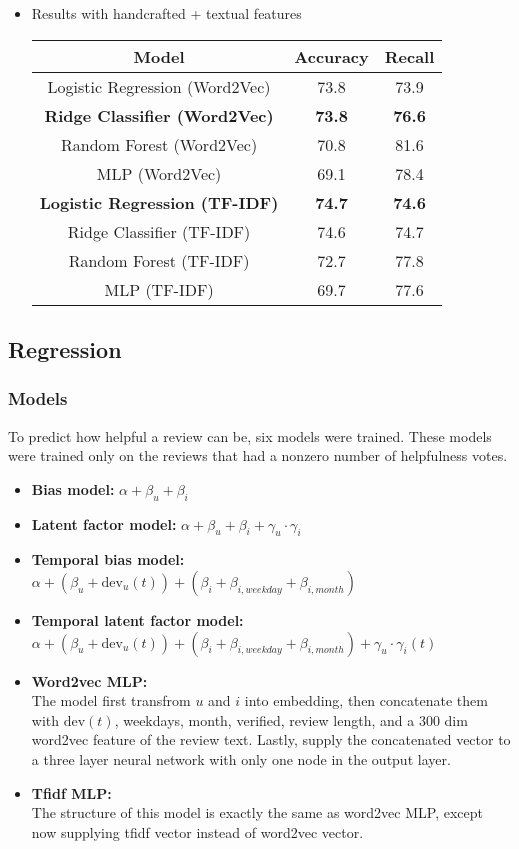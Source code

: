 \documentclass[final]{cvpr}
\begin{document}
\begin{itemize}
\item Results with handcrafted + textual features
\begin{center}
\begin{tabular}{ c c c } 
\hline
Model & Accuracy & Recall\\ 
\hline
Logistic Regression (Word2Vec) & 73.8 & 73.9 \\ 
\textbf{Ridge Classifier (Word2Vec)} & \textbf{73.8} & \textbf{76.6} \\
Random Forest (Word2Vec) & 70.8 & 81.6 \\
MLP (Word2Vec) & 69.1 & 78.4 \\
\textbf{Logistic Regression (TF-IDF)} & \textbf{74.7} & \textbf{74.6} \\ 
Ridge Classifier (TF-IDF) & 74.6 & 74.7 \\
Random Forest (TF-IDF) & 72.7 & 77.8 \\
MLP (TF-IDF) & 69.7 & 77.6 \\
\hline
\end{tabular}
\end{center}
\end{itemize}

\subsection{Regression}

\subsubsection{Models}
To predict how helpful a review can be, six models were trained. These models were trained only on the reviews that had a nonzero number of helpfulness votes.
\begin{itemize}
\item \textbf{Bias model:} $\alpha + \beta_u + \beta_i$
\item \textbf{Latent factor model:} $\alpha + \beta_u + \beta_i + \gamma_u \cdot \gamma_i$
\item \textbf{Temporal bias model:} \\
$\alpha + \left( \beta_u + \text{dev}_u(t)\right)+ \left(\beta_i + \beta_{i,weekday} + \beta_{i,month} \right)$
\item \textbf{Temporal latent factor model:}\\
$\alpha + \left( \beta_u + \text{dev}_u(t)\right)+ \left(\beta_i + \beta_{i,weekday} + \beta_{i,month} \right) + \gamma_u \cdot \gamma_i(t)$

\item \textbf{Word2vec MLP:}\\
The model first transfrom $u$ and $i$ into embedding, then concatenate them with $\text{dev}(t)$, weekdays, month, verified, review length, and a 300 dim word2vec feature of the review text.
Lastly, supply the concatenated vector to a three layer neural network with only one node in the output layer.

\item \textbf{Tfidf MLP:}\\
The structure of this model is exactly the same as word2vec MLP, except now supplying tfidf vector instead of word2vec vector.
\end{itemize}
\end{document}
